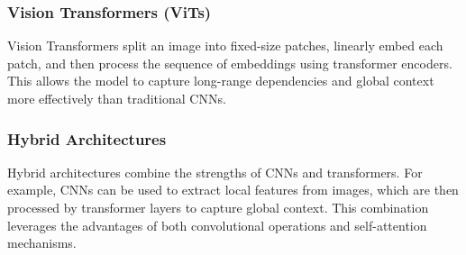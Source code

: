 \documentclass[12pt]{article}
\begin{document}
\subsubsection{Vision Transformers (ViTs)}
Vision Transformers split an image into fixed-size patches, linearly embed each patch, and then process the sequence of embeddings using transformer encoders. This allows the model to capture long-range dependencies and global context more effectively than traditional CNNs.

\subsubsection{Hybrid Architectures}
Hybrid architectures combine the strengths of CNNs and transformers. For example, CNNs can be used to extract local features from images, which are then processed by transformer layers to capture global context. This combination leverages the advantages of both convolutional operations and self-attention mechanisms.
\end{document}
